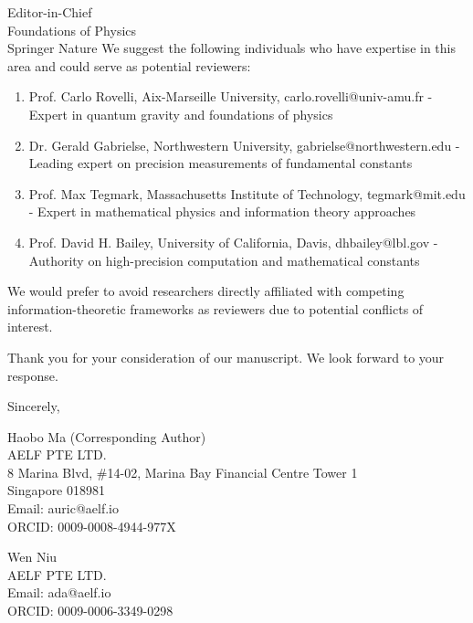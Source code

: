 \documentclass[12pt]{letter}
\begin{document}
\begin{letter}{Editor-in-Chief\\
Foundations of Physics\\
Springer Nature}
We suggest the following individuals who have expertise in this area and could serve as potential reviewers:

\begin{enumerate}
\item Prof. Carlo Rovelli, Aix-Marseille University, carlo.rovelli@univ-amu.fr - Expert in quantum gravity and foundations of physics
\item Dr. Gerald Gabrielse, Northwestern University, gabrielse@northwestern.edu - Leading expert on precision measurements of fundamental constants
\item Prof. Max Tegmark, Massachusetts Institute of Technology, tegmark@mit.edu - Expert in mathematical physics and information theory approaches
\item Prof. David H. Bailey, University of California, Davis, dhbailey@lbl.gov - Authority on high-precision computation and mathematical constants
\end{enumerate}

We would prefer to avoid researchers directly affiliated with competing information-theoretic frameworks as reviewers due to potential conflicts of interest.

Thank you for your consideration of our manuscript. We look forward to your response.

\closing{Sincerely,}

\vspace{0.5cm}
Haobo Ma (Corresponding Author)\\
AELF PTE LTD.\\
8 Marina Blvd, \#14-02, Marina Bay Financial Centre Tower 1\\
Singapore 018981\\
Email: auric@aelf.io\\
ORCID: 0009-0008-4944-977X

\vspace{0.5cm}
Wen Niu\\
AELF PTE LTD.\\
Email: ada@aelf.io\\
ORCID: 0009-0006-3349-0298

\end{letter}
\end{document}
